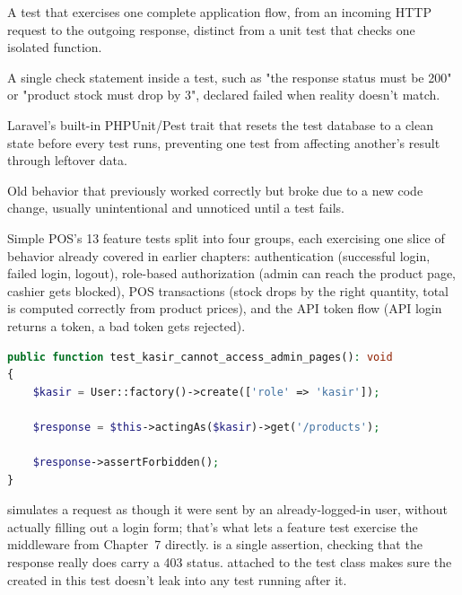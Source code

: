 \begin{istilahpenting}
\begin{description}[leftmargin=0pt,style=nextline]
  \item[Feature Test] A test that exercises one complete application flow, from an incoming HTTP request to the outgoing response, distinct from a unit test that checks one isolated function.
  \item[Assertion] A single check statement inside a test, such as "the response status must be 200" or "product stock must drop by 3", declared failed when reality doesn't match.
  \item[RefreshDatabase] Laravel's built-in PHPUnit/Pest trait that resets the test database to a clean state before every test runs, preventing one test from affecting another's result through leftover data.
  \item[Regression] Old behavior that previously worked correctly but broke due to a new code change, usually unintentional and unnoticed until a test fails.
\end{description}
\end{istilahpenting}

Simple POS's 13 feature tests split into four groups, each exercising
one slice of behavior already covered in earlier chapters:
authentication (successful login, failed login, logout), role-based
authorization (admin can reach the product page, cashier gets blocked),
POS transactions (stock drops by the right quantity, total is computed
correctly from product prices), and the API token flow (API login
returns a token, a bad token gets rejected).

\begin{lstlisting}[language=php, title=\lstfile{tests/Feature/ProductAuthorizationTest.php}]
public function test_kasir_cannot_access_admin_pages(): void
{
    $kasir = User::factory()->create(['role' => 'kasir']);

    $response = $this->actingAs($kasir)->get('/products');

    $response->assertForbidden();
}
\end{lstlisting}

 simulates a request as though it were sent
by an already-logged-in  user, without actually
filling out a login form; that's what lets a feature test exercise the
 middleware from Chapter~7 directly.
 is a single assertion, checking that the
response really does carry a 403 status. 
attached to the test class makes sure the  created in
this test doesn't leak into any test running after it.

